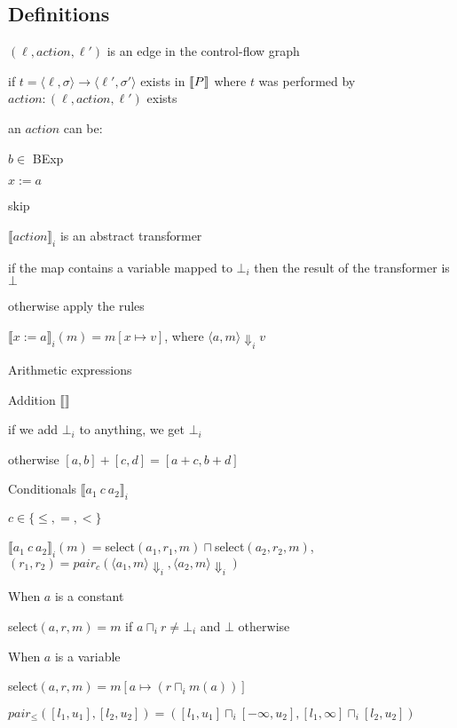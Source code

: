 \documentclass[10pt]{article}
\begin{document}
\subsection{Definitions}
\enumstart
	\item $(\ell, action, \ell')$ is an edge in the control-flow graph
	\item if $t = \langle \ell, \sigma \rangle \rightarrow \langle \ell', \sigma' \rangle$ exists in $\llbracket P \rrbracket$ where $t$ was performed by $action: (\ell, action, \ell')$ exists
	\item an $action$ can be:
	\enumstart
		\item $b \in$ BExp
		\item $x := a$
		\item skip
	\enumend
	\item $\llbracket action \rrbracket_i$ is an abstract transformer
	\enumstart
		\item if the map contains a variable mapped to $\bot_i$ then the result of the transformer is $\bot$
		\item otherwise apply the rules
	\enumend
	\item $\llbracket x := a\rrbracket_i(m) = m[x \mapsto v]$, where $\langle a,m \rangle \Downarrow_i v$
	\item Arithmetic expressions
	\enumstart
		\item Addition $\llbracket \rrbracket$
		\enumstart
			\item if we add $\bot_i$ to anything, we get $\bot_i$
			\item otherwise $[a,b]+[c,d] = [a+c, b+d]$
		\enumend
	\enumend
	\item Conditionals $\llbracket a_1 \ c \ a_2 \rrbracket_i$
	\enumstart
		\item $c \in \{\le, =, < \}$
		\item $\llbracket a_1 \ c \ a_2 \rrbracket_i(m) = $select$(a_1, r_1, m) \sqcap $select$(a_2, r_2, m)$, $(r_1, r_2) = pair_c(\langle a_1, m \rangle \Downarrow_i, \langle a_2, m \rangle \Downarrow_i)$
		\item When $a$ is a constant
		\enumstart
			\item select$(a,r,m) = m$ if $a \sqcap_i r \ne \bot_i$ and $\bot$ otherwise		\enumend
		\item When $a$ is a variable
		\enumstart
			\item select$(a,r,m) = m[a \mapsto (r \sqcap_i m(a))]$
		\enumend
		\item $pair_\le([l_1, u_1], [l_2, u_2]) = ([l_1, u_1] \sqcap_i [-\infty, u_2], [l_1, \infty] \sqcap_i [l_2, u_2])$
\end{document}
